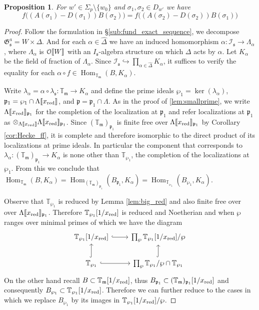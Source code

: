 \documentclass[leqno]{amsart}
\newtheorem{prop}[thm]{Proposition}
\theoremstyle{definition}
\theoremstyle{remark}
\newcommand{\eo}{\EuScript{O}}
\DeclareMathOperator{\Hom}{Hom}
\newcommand{\fm}{\mathfrak{m}}
\newcommand{\fp}{\mathfrak{p}}
\newcommand{\fs}{\mathfrak{s}}
\newcommand{\xx}{x_\textnormal{red}}
\newcommand{\fG}{\mathfrak{G}}
\newcommand{\TT}{\mathbb{T}} %
\newcommand{\I}{\mathcal{I}} %
\begin{document}
\begin{prop}\label{prop:res}
For $w'\in\Sigma_p\setminus\{w_0\}$
and $\sigma_1,\sigma_2\in D_{w'}$ we have
\[
f\big((A(\sigma_1)-D(\sigma_1))B(\sigma_2)\big)=
f\big((A(\sigma_2)-D(\sigma_2))B(\sigma_1)\big)
\]
\end{prop}
\begin{proof}

Follow the formulation in \S\ref{sub:fund_exact_sequence},
we decompose $\fG_\fs^a=W\times\Delta$.
And for each $\alpha\in\hat{\Delta}$ we have an induced homomorphism
$\alpha\colon \I_\fs\to \Lambda_\alpha$,
where $\Lambda_\alpha$ is $\eo\llbracket W\rrbracket$
with an $I_\fs$-algebra structure on which $\Delta$ acts by $\alpha$.
Let $K_\alpha$ be the field of fraction of $\Lambda_\alpha$.
Since $\I_\fs\hookrightarrow 
\prod_{\alpha\in\hat{\Delta}}K_\alpha$,
it suffices to verify the equality for each 
$\alpha\circ f\in \Hom_{\TT_\fm}(B,K_\alpha)$.



Write $\lambda_\alpha=\alpha\circ\lambda_\fs
\colon\TT_\fm\to K_\alpha$
and define the prime ideals $\wp_1=\ker(\lambda_\alpha)$,
$\fp_1=\wp_1\cap\Lambda\llbracket\xx\rrbracket$,
and $\fp=\fp_1\cap \Lambda$.
As in the proof of \ref{lem:smallprime},
we write $\Lambda\llbracket\xx\rrbracket_{\fp_1}$
for the completion of the localization at $\fp_1$
and refer localizations at $\fp_1$ as
$\otimes_{\Lambda\llbracket\xx\rrbracket}
\Lambda\llbracket\xx\rrbracket_{\fp_1}$.
Since $(\TT_{\fm})_{\fp_1}$ is finite free
over $\Lambda\llbracket\xx\rrbracket_{\fp_1}$
by Corollary \ref{cor:Hecke_ff},
it is complete and therefore isomorphic
to the direct product of its localizations 
at prime ideals.
In particular the component that corresponds to 
$\lambda_\alpha\colon (\TT_\fm)_{\fp_1}\to K_\alpha$
is none other than $\TT_{\wp_1}$,
the completion of the localizations at $\wp_1$.
From this we conclude that
$\Hom_{\TT_\fm}(B,K_\alpha)=
\Hom_{(\TT_\fm)_{\fp_1}}(B_{\fp_1},K_\alpha)=
\Hom_{\TT_{\wp_1}}(B_{\wp_1},K_\alpha)$.


Observe that $\TT_{\wp_1}$ is reduced by Lemma \ref{lem:big_red}
and also finite free over over 
$\Lambda\llbracket\xx\rrbracket_{\fp_1}$.
Therefore $\TT_{\wp_1}[1/\xx]$ is reduced and Noetherian
and when $\wp$ ranges over minimal primes of which we have the diagram
\[
\begin{tikzcd}
\TT_{\wp_1}[1/\xx] \arrow[r,hookrightarrow] &
\prod_{\wp} \TT_{\wp_1}[1/\xx]/\wp \\
\TT_{\wp_1} \arrow[u,hookrightarrow] \arrow[r,hookrightarrow] &
\prod_{\wp} \TT_{\wp_1}/\wp\cap \TT_{\wp_1}\arrow[u,hookrightarrow] 
\end{tikzcd}
\]
On the other hand recall $B\subset \TT_\fm[1/\xx]$,
thus $B_{\fp_1}\subset (\TT_\fm)_{\fp_1}[1/\xx]$ and 
consequently $B_{\wp_1}\subset \TT_{\wp_1}[1/\xx]$.
Therefore we can further reduce to the cases
in which we replace $B_{\wp_1}$
by its images in $\TT_{\wp_1}[1/\xx]/\wp$.


\end{proof}
\end{document}
